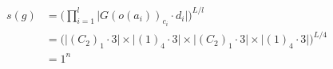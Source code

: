 \documentclass[preview]{standalone}
\begin{document}
\begin{align*}
s(g) &= \big(\prod_{i=1}^{l}\big|G(o(a_i))_{c_i}\cdot d_i\big|\big)^{L/l} \\   &= \big(\big|(C_2)_1\cdot 3\big| \times \big|(1)_4\cdot 3\big|\times \big|(C_2)_1\cdot 3\big| \times \big|(1)_4\cdot 3\big|)^{L/4} \\   &= 1^{n}\phantom{teee}
\end{align*}
\end{document}
